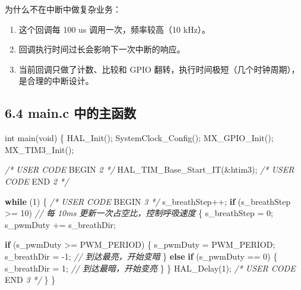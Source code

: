 \documentclass[
  chinese,
  UTF8,
  oneside,
  openany]{ctexbook}
\newenvironment{Shaded}{}{}
\newcommand{\CommentTok}[1]{\textcolor[rgb]{0.38,0.63,0.69}{\textit{#1}}}
\newcommand{\ControlFlowTok}[1]{\textcolor[rgb]{0.00,0.44,0.13}{\textbf{#1}}}
\newcommand{\DataTypeTok}[1]{\textcolor[rgb]{0.56,0.13,0.00}{#1}}
\newcommand{\DecValTok}[1]{\textcolor[rgb]{0.25,0.63,0.44}{#1}}
\newcommand{\NormalTok}[1]{#1}
\newcommand{\OperatorTok}[1]{\textcolor[rgb]{0.40,0.40,0.40}{#1}}
\newcommand{\RegionMarkerTok}[1]{#1}
\providecommand{\tightlist}{%
  \setlength{\itemsep}{0pt}\setlength{\parskip}{0pt}}
\begin{document}
为什么不在中断中做复杂业务：

\begin{enumerate}
\def\labelenumi{\arabic{enumi}.}
\tightlist
\item
  这个回调每 100 us 调用一次，频率较高（10 kHz）。
\item
  回调执行时间过长会影响下一次中断的响应。
\item
  当前回调只做了计数、比较和 GPIO
  翻转，执行时间极短（几个时钟周期），是合理的中断设计。
\end{enumerate}

\subsection{6.4 main.c
中的主函数}\label{main.c-ux4e2dux7684ux4e3bux51fdux6570}

\begin{Shaded}
\begin{Highlighting}[]
\DataTypeTok{int}\NormalTok{ main}\OperatorTok{(}\DataTypeTok{void}\OperatorTok{)}
\OperatorTok{\{}
\NormalTok{    HAL\_Init}\OperatorTok{();}
\NormalTok{    SystemClock\_Config}\OperatorTok{();}
\NormalTok{    MX\_GPIO\_Init}\OperatorTok{();}
\NormalTok{    MX\_TIM3\_Init}\OperatorTok{();}

    \CommentTok{/* USER CODE }\RegionMarkerTok{BEGIN}\CommentTok{ 2 */}
\NormalTok{    HAL\_TIM\_Base\_Start\_IT}\OperatorTok{(\&}\NormalTok{htim3}\OperatorTok{);}
    \CommentTok{/* USER CODE }\RegionMarkerTok{END}\CommentTok{ 2 */}

    \ControlFlowTok{while} \OperatorTok{(}\DecValTok{1}\OperatorTok{)}
    \OperatorTok{\{}
        \CommentTok{/* USER CODE }\RegionMarkerTok{BEGIN}\CommentTok{ 3 */}
\NormalTok{        s\_breathStep}\OperatorTok{++;}
        \ControlFlowTok{if} \OperatorTok{(}\NormalTok{s\_breathStep }\OperatorTok{\textgreater{}=} \DecValTok{10}\OperatorTok{)}  \CommentTok{// 每 10ms 更新一次占空比，控制呼吸速度}
        \OperatorTok{\{}
\NormalTok{            s\_breathStep }\OperatorTok{=} \DecValTok{0}\OperatorTok{;}
\NormalTok{            s\_pwmDuty }\OperatorTok{+=}\NormalTok{ s\_breathDir}\OperatorTok{;}

            \ControlFlowTok{if} \OperatorTok{(}\NormalTok{s\_pwmDuty }\OperatorTok{\textgreater{}=}\NormalTok{ PWM\_PERIOD}\OperatorTok{)}
            \OperatorTok{\{}
\NormalTok{                s\_pwmDuty }\OperatorTok{=}\NormalTok{ PWM\_PERIOD}\OperatorTok{;}
\NormalTok{                s\_breathDir }\OperatorTok{=} \OperatorTok{{-}}\DecValTok{1}\OperatorTok{;}  \CommentTok{// 到达最亮，开始变暗}
            \OperatorTok{\}}
            \ControlFlowTok{else} \ControlFlowTok{if} \OperatorTok{(}\NormalTok{s\_pwmDuty }\OperatorTok{==} \DecValTok{0}\OperatorTok{)}
            \OperatorTok{\{}
\NormalTok{                s\_breathDir }\OperatorTok{=} \DecValTok{1}\OperatorTok{;}   \CommentTok{// 到达最暗，开始变亮}
            \OperatorTok{\}}
        \OperatorTok{\}}
\NormalTok{        HAL\_Delay}\OperatorTok{(}\DecValTok{1}\OperatorTok{);}
        \CommentTok{/* USER CODE }\RegionMarkerTok{END}\CommentTok{ 3 */}
    \OperatorTok{\}}
\OperatorTok{\}}
\end{Highlighting}
\end{Shaded}
\end{document}
